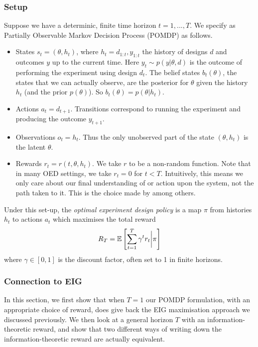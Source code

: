 \subsubsection{Setup}
Suppose we have a determinic, finite time horizon $t=1, ..., T$. We specify as Partially Observable Markov Decision Process (POMDP) as follows.
\begin{itemize}
\item States $s_t = (\theta, h_t)$, where $h_t = d_{1:t}, y_{1:t}$ the history of designs $d$ and outcomes $y$ up to the current time. Here $y_t \sim p(y | \theta, d)$ is the outcome of performing the experiment using design $d_t$.  The belief states $b_t(\theta)$, the states that we can actually observe, are the posterior for $\theta$ given the history $h_t$ (and the prior $p(\theta)$). So $b_t(\theta) = p(\theta | h_t)$.
\item Actions $a_t = d_{t+1}$. Transitions correspond to running the experiment and producing the outcome $y_{t+1}$.
\item Observations $o_t = h_t$. Thus the only unobserved part of the state $(\theta, h_t)$ is the latent $\theta$.
\item Rewards $r_t = r(t, \theta, h_t)$. We take $r$ to be a non-random function. Note that in many OED settings, we take $r_t = 0$ for $t<T$. Intuitively, this means we only care about our final understanding of or action upon the system, not the path taken to it. This is the choice made by \cite{gonzalez2016} among others.
\end{itemize}
Under this set-up, the \textit{optimal experiment design policy} is a map $\pi$ from histories $h_t$ to actions $a_t$ which maximises the total reward
\begin{equation}
	R_T = \mathbb{E} \left[ \sum_{t=1}^T \gamma^t r_t \bigg{\rvert} \pi \right]
\end{equation}
where $\gamma \in [0,1]$ is the discount factor, often set to 1 in finite horizons.


\subsubsection{Connection to EIG}
In this section, we first show that when $T=1$ our POMDP formulation, with an appropriate choice of reward, does give back the EIG maximisation approach we discussed previously. We then look at a general horizon $T$ with an information-theoretic reward, and show that two different ways of writing down the information-theoretic reward are actually equivalent.

